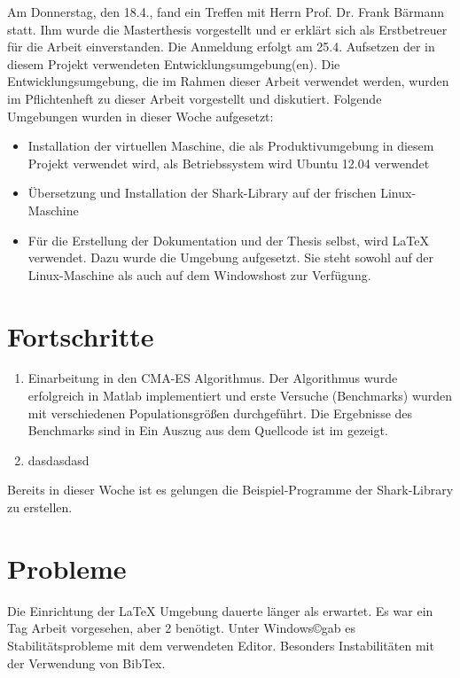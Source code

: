 ﻿\documentclass[a4paper,12pt,fleqn]{scrartcl}
\begin{document}
Am Donnerstag, den 18.4., fand ein Treffen mit Herrn Prof.
Dr. Frank Bärmann statt. Ihm wurde die Masterthesis vorgestellt und er erklärt
sich als Erstbetreuer für die Arbeit einverstanden.
Die Anmeldung erfolgt am 25.4.
Aufsetzen der in diesem Projekt verwendeten Entwicklungsumgebung(en). Die
Entwicklungsumgebung, die im Rahmen dieser Arbeit verwendet werden, wurden im Pflichtenheft zu dieser Arbeit vorgestellt und diskutiert.
Folgende Umgebungen wurden in dieser Woche aufgesetzt:
\begin{itemize}
  \item Installation der virtuellen Maschine, die als Produktivumgebung in diesem
Projekt verwendet wird, als Betriebssystem wird Ubuntu 12.04 verwendet
  \item Übersetzung und Installation der Shark-Library auf der frischen
  Linux-Maschine
  \item Für die Erstellung der Dokumentation und der Thesis selbst, wird \LaTeX{} verwendet.
  Dazu wurde die Umgebung aufgesetzt. Sie steht sowohl auf der Linux-Maschine als auch auf dem Windowshost zur Verfügung.
\end{itemize}

\section[Fortschritte]{Fortschritte}
\begin{enumerate}
 \item Einarbeitung in den CMA-ES Algorithmus. Der Algorithmus wurde erfolgreich in Matlab
      implementiert und erste Versuche (Benchmarks) wurden mit verschiedenen Populationsgrößen durchgeführt. Die Ergebnisse des Benchmarks sind in
      Ein Auszug aus dem Quellcode ist im  gezeigt.
 \item
        dasdasdasd
\end{enumerate}

Bereits in dieser Woche ist es gelungen die Beispiel-Programme der Shark-Library zu erstellen.

\section[Probleme]{Probleme}
Die Einrichtung der \LaTeX{} Umgebung dauerte länger als erwartet. Es war ein Tag Arbeit
vorgesehen, aber 2 benötigt. \newline
Unter Windows\copyright gab es Stabilitätsprobleme mit dem verwendeten Editor. Besonders Instabilitäten mit der Verwendung von BibTex.
\end{document}
